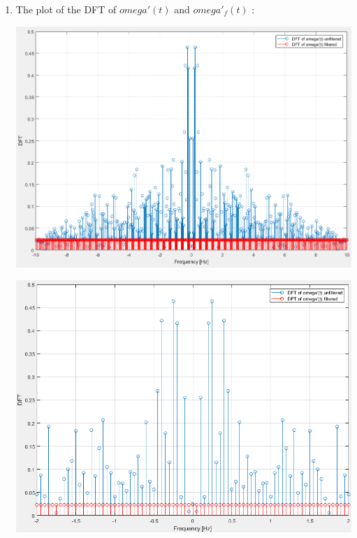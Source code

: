 \documentclass[a4paper,12pt]{article}
\begin{document}
\begin{enumerate}[label={\color{blue}\arabic*)}]
\begin{multicols}{2}
    \end{multicols}

    \item
    The plot of the DFT of \(omega'(t)\) and \(omega'_f(t)\) :
    \begin{multicols}{2}
    \begin{flushleft}
            \includegraphics[width=1\linewidth]{Images/DFT_omega_dot_filtered.png}
            \label{Figure11}
        \end{flushleft}
    \columnbreak
    \begin{flushright}
            \includegraphics[width=1\linewidth]{Images/DFT_omega_dot_filtered_zoomed.png}
            \label{Figure12}
        \end{flushright}
        

\end{multicols}
\end{enumerate}
\end{document}
